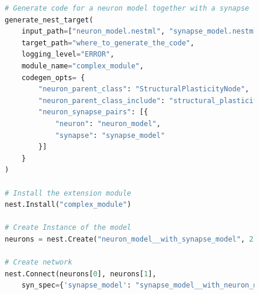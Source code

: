 \vspace{0.5em}
\begin{figure}[ht!]
\centering
\begin{lstlisting}[language=Python, label=lst:nestml_with_synapse, caption={The \texttt{generate\_nest\_target} function generates code for the neuron and synapse together. The \texttt{input\_path} takes a list of NESTML files with the first being the neuron model and the second the synapse model. The library will be generated with the name \emph{complex\_module}. In contrast to the simple case in \autoref{lst:nestml_without_synapse}, co-generating the code for the neuron and synapse requires the user to provide the \texttt{codegen\_opts} to specify the relation between the neuron and the synapse. Installing the new library is not different from the previous case, we simply call the \texttt{Install()} function with \emph{complex\_module} as the library name. The main difference is in the creation of model instances. The neuron model is no longer registered in NEST under the name \emph{"neuron\_model}, but the neuron name is now the concatenation of the neuron name and the synapse name to express the relation between the two. The same name mangling is applied for the synapse models, which becomes available under the name \emph{synapse\_model\_\_with\_neuron\_model}. These name changes have to be manually tracked by the user when calling \texttt{Create()} and \texttt{Connect()}.}, captionpos=b]
# Generate code for a neuron model together with a synapse
generate_nest_target(
    input_path=["neuron_model.nestml", "synapse_model.nestml"],
    target_path="where_to_generate_the_code",
    logging_level="ERROR",
    module_name="complex_module",
    codegen_opts= {
        "neuron_parent_class": "StructuralPlasticityNode",
        "neuron_parent_class_include": "structural_plasticity_node.h",
        "neuron_synapse_pairs": [{
            "neuron": "neuron_model",
            "synapse": "synapse_model"
        }]
    }
)

# Install the extension module
nest.Install("complex_module")
                                                          
# Create Instance of the model
neurons = nest.Create("neuron_model__with_synapse_model", 2)

# Create network
nest.Connect(neurons[0], neurons[1],
    syn_spec={'synapse_model': "synapse_model__with_neuron_model"})
\end{lstlisting}
\end{figure}


